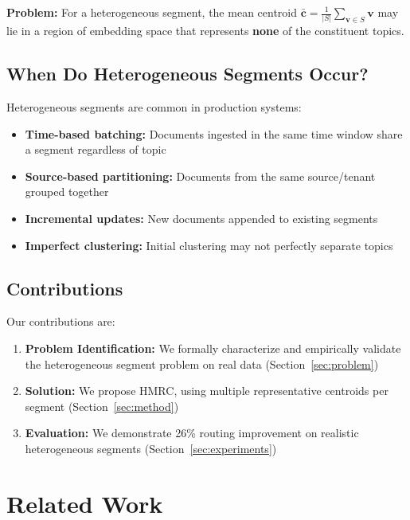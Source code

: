 \documentclass[sigconf, nonacm]{acmart}
\begin{document}
\textbf{Problem:} For a heterogeneous segment, the mean centroid $\bar{\mathbf{c}} = \frac{1}{|S|}\sum_{\mathbf{v} \in S} \mathbf{v}$ may lie in a region of embedding space that represents \textbf{none} of the constituent topics.

\subsection{When Do Heterogeneous Segments Occur?}

Heterogeneous segments are common in production systems:

\begin{itemize}
    \item \textbf{Time-based batching:} Documents ingested in the same time window share a segment regardless of topic
    \item \textbf{Source-based partitioning:} Documents from the same source/tenant grouped together
    \item \textbf{Incremental updates:} New documents appended to existing segments
    \item \textbf{Imperfect clustering:} Initial clustering may not perfectly separate topics
\end{itemize}

\subsection{Contributions}

Our contributions are:
\begin{enumerate}
    \item \textbf{Problem Identification:} We formally characterize and empirically validate the heterogeneous segment problem on real data (Section~\ref{sec:problem})
    \item \textbf{Solution:} We propose HMRC, using multiple representative centroids per segment (Section~\ref{sec:method})
    \item \textbf{Evaluation:} We demonstrate 26\% routing improvement on realistic heterogeneous segments (Section~\ref{sec:experiments})
\end{enumerate}


\section{Related Work}
\end{document}
